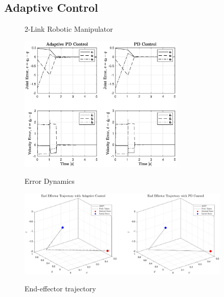 \subsection*{Adaptive Control}
	\begin{figure}[H]
		\centering
		\caption{2-Link Robotic Manipulator}
		\label{fig:manip2link}
	\end{figure}

	\begin{figure}[H]
		\centering
		\includegraphics[width=0.7\textwidth]{figures/adpdErr.eps}
		\label{fig:adpdErr}
		\caption{Error Dynamics}
	\end{figure}

	\begin{figure}[H]
		\centering
		\includegraphics[width=0.9\textwidth]{figures/eeTraj.eps}
		\label{fig:eeTraj}
		\caption{End-effector trajectory}
	\end{figure}

